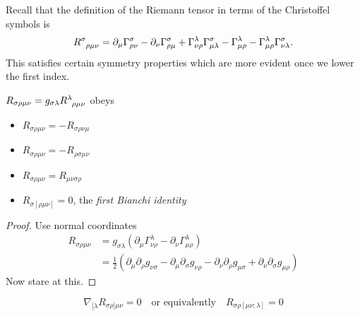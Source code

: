 Recall that the definition of the Riemann tensor in terms of the Christoffel symbols is
\begin{equation}
  R \indices{^{\sigma}_{\rho\mu\nu}} = \partial_{\mu} \Gamma^{\sigma}_{\rho\nu} - \partial_{\nu} \Gamma^{\sigma}_{\rho\mu} + \Gamma^{\lambda}_{\nu\rho} \Gamma^{\sigma}_{\mu\lambda} - \Gamma^{\lambda}_{\mu\rho} - \Gamma^{\lambda}_{\mu\rho} \Gamma^{\sigma}_{\nu\lambda}.
\end{equation}
This satisfies certain symmetry properties which are more evident once we lower the first index.
\begin{claim}
  $R_{\sigma\rho\mu\nu} = g_{\sigma\lambda} R \indices{^{\lambda}_{\rho\mu\nu}}$ obeys
  \begin{itemize}
    \item $R_{\sigma\rho\mu\nu} = -R_{\sigma\rho\nu\mu}$
    \item $R_{\sigma\rho\mu\nu} = - R_{\rho\sigma\mu\nu}$
    \item $R_{\sigma\rho\mu\nu} = R_{\mu\nu\sigma\rho}$
    \item $R_{\sigma[\rho\mu\nu]} = 0$, the \emph{first Bianchi identity}
  \end{itemize}
\end{claim}
\begin{proof}
  Use normal coordinates
  \begin{align}
    R_{\sigma\rho\mu\nu} &= g_{\sigma\lambda} (\partial_{\mu} \Gamma^{\lambda}_{\nu\rho} -\partial_{\nu} \Gamma^{\lambda}_{\mu\rho}) \\
			 &= \frac{1}{2} (\partial_{\mu} \partial_{\rho} g_{\nu\sigma} - \partial_{\mu} \partial_{\sigma} g_{\nu\rho} - \partial_{\nu} \partial_{\rho} g_{\mu\sigma} + \partial_{\nu} \partial_{\sigma} g_{\mu\rho})
  \end{align}
  Now stare at this.
\end{proof}
\begin{claim}
\begin{equation}
  \nabla_{[\lambda} R_{\sigma\rho] \mu\nu} = 0 \quad \text{or equivalently} \quad R_{\sigma\rho[\mu\nu;\lambda]} = 0
\end{equation}
\end{claim}
